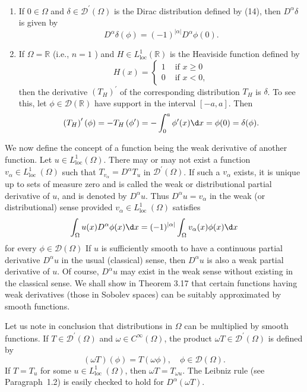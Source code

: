 \begin{examples}\mbox{}\par
  \begin{enumerate}[1.]
    \item  If $0 \in \Omega$ and $\delta \in \mathscr{D}^{\prime}(\Omega)$ is the Dirac 
      distribution defined by (14), then $D^\alpha \delta$ is given by
      \[
      D^\alpha \delta(\phi)=(-1)^{|\alpha|} D^\alpha \phi(0).
      \]
    \item If $\Omega=\mathbb{R}$ (i.e., $n=1$ ) and $H \in L_{\text{loc}}^1(\mathbb{R})$
      is the Heaviside function defined by
      \[
      H(x) =
      \begin{cases}
        1 & \text { if } x \geq 0 \\
        0 & \text { if } x<0,
      \end{cases}
      \]
      then the derivative $\left(T_H\right)^{\prime}$ of the corresponding distribution $T_H$
      is $\delta$. To see this, let $\phi \in \mathscr{D}(\mathbb{R})$ have support in the 
      interval $[-a, a]$. Then
      \[
      \left(T_H\right)^{\prime}(\phi)=-T_H\left(\phi^{\prime}\right)=-\int_0^a \phi^{\prime}(x) \d x=\phi(0)=\delta(\phi).
      \]
  \end{enumerate}
\end{examples}


\begin{para}
  We now define the concept of a function being the weak derivative of another function. Let $u \in L_{\mathrm{loc}}^1(\Omega)$. There may or may not exist a function $v_\alpha \in L_{\text {loc }}^1(\Omega)$ such that $T_{v_\alpha}=D^\alpha T_u$ in $\mathscr{D}^{\prime}(\Omega)$. If such a $v_\alpha$ exists, it is unique up to sets of measure zero and is called the weak or distributional partial derivative of $u$, and is denoted by $D^\alpha u$. Thus $D^\alpha u=v_\alpha$ in the weak (or distributional) sense provided $v_\alpha \in L_{\text {loc }}^1(\Omega)$ satisfies
  \[
  \int_{\Omega} u(x) D^\alpha \phi(x) \d x=(-1)^{|\alpha|} \int_{\Omega} v_\alpha(x) \phi(x) \d x
  \]
  for every $\phi \in \mathscr{D}(\Omega)$
  If $u$ is sufficiently smooth to have a continuous partial derivative $D^\alpha u$ in the usual (classical) sense, then $D^\alpha u$ is also a weak partial derivative of $u$. Of course, $D^\alpha u$ may exist in the weak sense without existing in the classical sense. We shall show in Theorem 3.17 that certain functions having weak derivatives (those in Sobolev spaces) can be suitably approximated by smooth functions.
\end{para}


\begin{para}
  Let us note in conclusion that distributions in $\Omega$ can be multiplied by smooth functions. If $T \in \mathscr{D}^{\prime}(\Omega)$ and $\omega \in C^{\infty}(\Omega)$, the product $\omega T \in \mathscr{D}^{\prime}(\Omega)$ is defined by
  \[
  (\omega T)(\phi)=T(\omega \phi), \quad \phi \in \mathscr{D}(\Omega) .
  \]
  If $T=T_u$ for some $u \in L_{\text {loc }}^1(\Omega)$, then $\omega T=T_{\omega u}$. The Leibniz rule (see Paragraph~1.2) is easily checked to hold for $D^\alpha(\omega T)$.
\end{para}